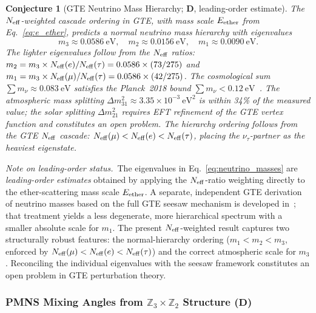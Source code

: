 \documentclass[11pt]{article}
\newtheorem{conjecture}[theorem]{Conjecture}
\theoremstyle{remark}
\newcommand{\CatD}{\textbf{D}}
\begin{document}
\begin{conjecture}[GTE Neutrino Mass Hierarchy; $\CatD$, leading-order estimate]
\label{conj:neutrino_masses}
The $N_{\rm eff}$-weighted cascade ordering in GTE, with mass scale $E_{\rm ether}$
from Eq.~\eqref{eq:e_ether}, predicts a normal neutrino mass hierarchy with eigenvalues
\begin{equation}
  m_3 \approx 0.0586~\mathrm{eV},\quad
  m_2 \approx 0.0156~\mathrm{eV},\quad
  m_1 \approx 0.0090~\mathrm{eV}.
  \label{eq:neutrino_masses}
\end{equation}
The lighter eigenvalues follow from the $N_{\rm eff}$ ratios:
$m_2 = m_3\times N_{\rm eff}(e)/N_{\rm eff}(\tau) = 0.0586\times(73/275)$ and
$m_1 = m_3\times N_{\rm eff}(\mu)/N_{\rm eff}(\tau) = 0.0586\times(42/275)$.
The cosmological sum $\sum m_\nu \approx 0.083~\mathrm{eV}$ satisfies the Planck~2018
bound $\sum m_\nu < 0.12~\mathrm{eV}$~\cite{Planck2018}.
The atmospheric mass splitting $\Delta m^2_{31} \approx 3.35 \times 10^{-3}~\mathrm{eV}^2$
is within 34\% of the measured value; the solar splitting $\Delta m^2_{21}$ requires
EFT refinement of the GTE vertex function and constitutes an open problem.
The hierarchy ordering follows from the GTE $N_{\rm eff}$ cascade:
$N_{\rm eff}(\mu) < N_{\rm eff}(e) < N_{\rm eff}(\tau)$, placing the $\nu_\tau$-partner
as the heaviest eigenstate.
\end{conjecture}

\noindent\textit{Note on leading-order status.}\ The eigenvalues in
Eq.~\eqref{eq:neutrino_masses} are \emph{leading-order estimates} obtained by applying
the $N_{\rm eff}$-ratio weighting directly to the ether-scattering mass scale
$E_{\rm ether}$.  A separate, independent GTE derivation of neutrino masses based on the
full GTE seesaw mechanism is developed in~\cite{Spivack2026_SM_UGP,SpivackNeutrino};
that treatment yields a less degenerate, more hierarchical spectrum with a smaller
absolute scale for $m_1$.  The present $N_{\rm eff}$-weighted result captures two
structurally robust features: the normal-hierarchy ordering
($m_1 < m_2 < m_3$, enforced by
$N_{\rm eff}(\mu) < N_{\rm eff}(e) < N_{\rm eff}(\tau)$) and the correct atmospheric
scale for $m_3$.  Reconciling the individual eigenvalues with the seesaw framework
constitutes an open problem in GTE perturbation theory.

\subsubsection*{PMNS Mixing Angles from \texorpdfstring{$\mathbb{Z}_3 \times \mathbb{Z}_2$}{Z3 x Z2}
  Structure ($\CatD$)}
\label{sec:pmns_mixing}
\end{document}
